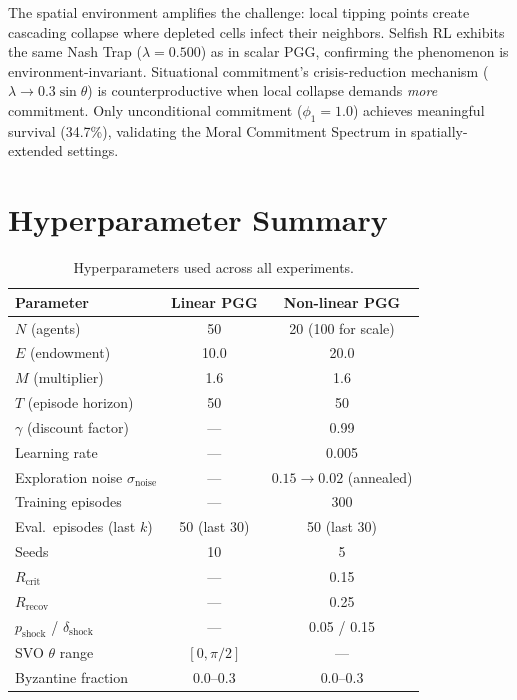 \documentclass{article}
\begin{document}
\noindent The spatial environment amplifies the challenge: local tipping points create cascading collapse where depleted cells infect their neighbors.
Selfish RL exhibits the same Nash Trap ($\lambda = 0.500$) as in scalar PGG, confirming the phenomenon is environment-invariant.
Situational commitment's crisis-reduction mechanism ($\lambda \to 0.3\sin\theta$) is counterproductive when local collapse demands \emph{more} commitment.
Only unconditional commitment ($\phi_1 = 1.0$) achieves meaningful survival (34.7\%), validating the Moral Commitment Spectrum in spatially-extended settings.

\section{Hyperparameter Summary}
\label{app:hyperparams}

\begin{table}[h]
\centering
\caption{Hyperparameters used across all experiments.}
\label{tab:hyperparams}
\begin{tabular}{lcc}
\toprule
\textbf{Parameter} & \textbf{Linear PGG} & \textbf{Non-linear PGG} \\
\midrule
$N$ (agents) & 50 & 20 (100 for scale) \\
$E$ (endowment) & 10.0 & 20.0 \\
$M$ (multiplier) & 1.6 & 1.6 \\
$T$ (episode horizon) & 50 & 50 \\
$\gamma$ (discount factor) & --- & 0.99 \\
Learning rate & --- & 0.005 \\
Exploration noise $\sigma_{\text{noise}}$ & --- & $0.15 \to 0.02$ (annealed) \\
Training episodes & --- & 300 \\
Eval.\ episodes (last $k$) & 50 (last 30) & 50 (last 30) \\
Seeds & 10 & 5 \\
$R_{\text{crit}}$ & --- & 0.15 \\
$R_{\text{recov}}$ & --- & 0.25 \\
$p_{\text{shock}}$ / $\delta_{\text{shock}}$ & --- & 0.05 / 0.15 \\
SVO $\theta$ range & $[0, \pi/2]$ & --- \\
Byzantine fraction & 0.0--0.3 & 0.0--0.3 \\
\bottomrule
\end{tabular}
\end{table}
\end{document}
